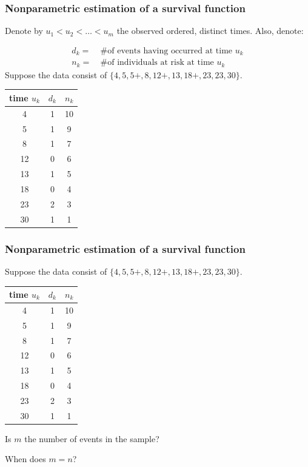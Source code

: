 \documentclass[12pt, 
hyperref={colorlinks=true, linkcolor=blue, urlcolor=cyan},dvipsnames]{beamer}
\begin{document}
\begin{frame}
\frametitle{Nonparametric estimation of a survival function}

{\small Denote by $u_1 < u_2 < \dots < u_m$ the observed ordered, distinct times. Also, denote: \vspace{-1cm}

\begin{align*}
d_k = & \ \text{\# of events having occurred at time $u_k$} \\
n_k = & \ \text{\# of individuals at risk at time $u_k$}
\end{align*}
\vspace{-0.5cm}
Suppose the data consist of $\{4, 5, 5+, 8, 12+, 13, 18+, 23, 23, 30\}$.

\begin{center}
\begin{tabular}{|c|c|c|}
\hline
time $u_k$ & $d_k$ & $n_k$ \\
\hline
4 & 1 & 10 \\
5 & 1 & 9 \\
8 & 1 & 7 \\
12 & 0 & 6 \\
13 & 1 & 5 \\
18 & 0 & 4 \\
23 & 2 & 3 \\
30 & 1 & 1 \\
\hline
\end{tabular}
\end{center}
}
\end{frame}

\begin{frame}
\frametitle{Nonparametric estimation of a survival function}

{\small Suppose the data consist of $\{4, 5, 5+, 8, 12+, 13, 18+, 23, 23, 30\}$.}

\begin{center}
\begin{tabular}{|c|c|c|}
\hline
time $u_k$ & $d_k$ & $n_k$ \\
\hline
4 & 1 & 10 \\
5 & 1 & 9 \\
8 & 1 & 7 \\
12 & 0 & 6 \\
13 & 1 & 5 \\
18 & 0 & 4 \\
23 & 2 & 3 \\
30 & 1 & 1 \\
\hline
\end{tabular}
\end{center}

Is $m$ the number of events in the sample? \underline{\;\;\phantom{right}\;\;}

When does $m = n$? \underline{\;\;\phantom{right}\;\;}
\end{frame}
\end{document}
